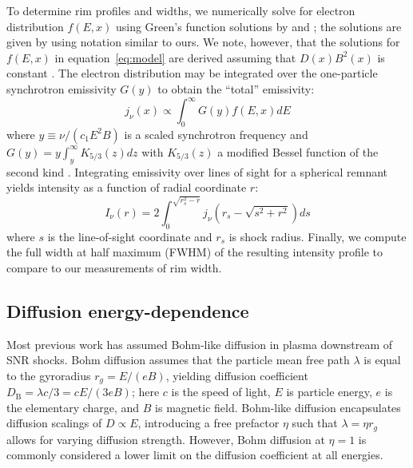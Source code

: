 \documentclass[iop, apj, numberedappendix]{emulateapj}
\newcommand*{\mt}{\mathrm}
\begin{document}
To determine rim profiles and widths, we numerically solve for electron
distribution $f(E,x)$ using Green's function solutions by \citet{lerche1980}
and \citet{rettig2012}; the solutions are given by 
using notation similar to ours.  We note, however, that the solutions for
$f(E,x)$ in equation~\eqref{eq:model} are derived assuming that $D(x) B^2(x)$
is constant \citep{lerche1980}.  The electron distribution may be integrated
over the one-particle synchrotron emissivity $G(y)$ to obtain the ``total''
emissivity:
\begin{equation} \label{eq:emissivity}
    j_{\nu}(x) \propto \int_0^\infty G(y) f(E,x) dE
\end{equation}
where $y \equiv \nu/(c_1 E^2 B)$ is a scaled synchrotron frequency and
$G(y) = y \int_y^\infty K_{5/3}(z) dz$ with $K_{5/3}(z)$ a modified Bessel
function of the second kind \citep{pacholczyk1970}.  Integrating emissivity
over lines of sight for a spherical remnant yields intensity as a function of
radial coordinate $r$:
\begin{equation} \label{eq:intensity}
    I_{\nu}(r) = 2 \int_0^{\sqrt{r_s^2 - r}}
                   j_{\nu} \left( r_s - \sqrt{s^2 + r^2} \right) ds
\end{equation}
where $s$ is the line-of-sight coordinate and $r_s$ is shock radius.  Finally,
we compute the full width at half maximum (FWHM) of the resulting intensity
profile to compare to our measurements of rim width.

\subsection{Diffusion energy-dependence} \label{sec:diffcoeff}

Most previous work has assumed Bohm-like diffusion in plasma downstream of SNR
shocks.  Bohm diffusion assumes that the particle mean free path $\lambda$ is
equal to the gyroradius $r_g = E/(eB)$, yielding diffusion coefficient
$D_{\mt{B}} = \lambda c / 3 = c E / (3 e B)$; here $c$ is the speed of light,
$E$ is particle energy, $e$ is the elementary charge, and $B$ is magnetic
field.  Bohm-like diffusion encapsulates diffusion scalings of $D \propto E$,
introducing a free prefactor $\eta$ such that $\lambda = \eta r_g$ allows for
varying diffusion strength.  However, Bohm diffusion at $\eta = 1$ is commonly
considered a lower limit on the diffusion coefficient at all energies.
\end{document}
